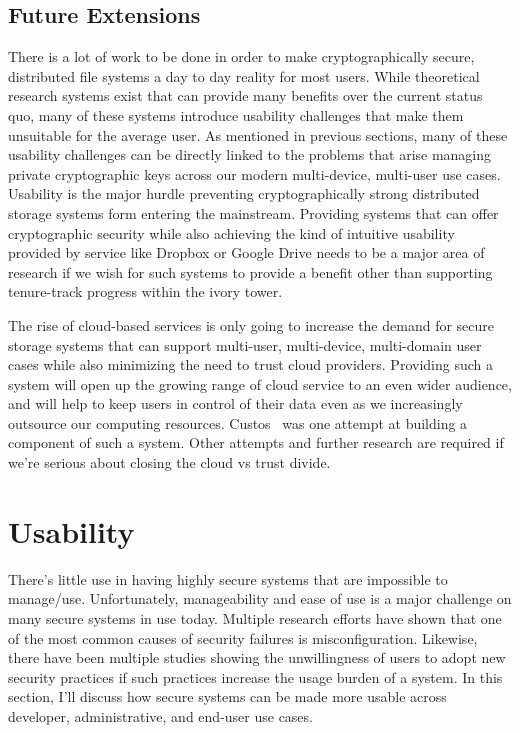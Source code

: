 \documentclass{sig-alternate}
\begin{document}
\subsection{Future Extensions}

There is a lot of work to be done in order to make cryptographically
secure, distributed file systems a day to day reality for most
users. While theoretical research systems exist that can provide many
benefits over the current status quo, many of these systems introduce
usability challenges that make them unsuitable for the average
user. As mentioned in previous sections, many of these usability
challenges can be directly linked to the problems that arise managing
private cryptographic keys across our modern multi-device, multi-user
use cases. Usability is the major hurdle preventing cryptographically
strong distributed storage systems form entering the
mainstream. Providing systems that can offer cryptographic security
while also achieving the kind of intuitive usability provided by
service like Dropbox or Google Drive needs to be a major area of
research if we wish for such systems to provide a benefit other than
supporting tenure-track progress within the ivory tower.

The rise of cloud-based services is only going to increase the demand
for secure storage systems that can support multi-user, multi-device,
multi-domain user cases while also minimizing the need to trust cloud
providers. Providing such a system will open up the growing range of
cloud service to an even wider audience, and will help to keep users
in control of their data even as we increasingly outsource our
computing resources. Custos~\cite{custos-masters} was one attempt at
building a component of such a system. Other attempts and further
research are required if we're serious about closing the cloud vs
trust divide.

\section{Usability}
\label{sec:mgmt}

There's little use in having highly secure systems that are impossible
to manage/use. Unfortunately, manageability and ease of use is a major
challenge on many secure systems in use today. Multiple research
efforts have shown that one of the most common causes of security
failures is misconfiguration. Likewise, there have been multiple
studies showing the unwillingness of users to adopt new security
practices if such practices increase the usage burden of a system. In
this section, I'll discuss how secure systems can be made more usable
across developer, administrative, and end-user use cases.
\end{document}
